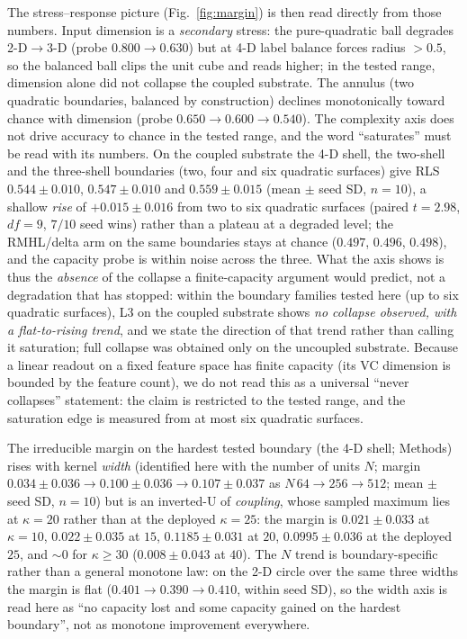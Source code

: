 \documentclass[preprint,12pt]{elsarticle}
\begin{document}
The stress--response picture (Fig.~\ref{fig:margin}) is then read directly
from those numbers. Input dimension is a \emph{secondary} stress: the pure-quadratic
ball degrades 2-D$\to$3-D (probe $0.800\to0.630$) but at 4-D label balance
forces radius $>0.5$, so the balanced ball clips the unit cube and reads
higher; in the tested range, dimension alone did not collapse the coupled
substrate. The
annulus (two quadratic boundaries, balanced by construction) declines
monotonically toward chance with dimension (probe $0.650\to0.600\to0.540$).
The complexity axis does not drive accuracy to chance in the tested range, and
the word ``saturates'' must be read with its numbers. On the coupled substrate
the 4-D shell, the two-shell and the three-shell boundaries (two, four and six
quadratic surfaces) give RLS $0.544\pm0.010$, $0.547\pm0.010$ and
$0.559\pm0.015$ (mean $\pm$ seed SD, $n=10$), a shallow \emph{rise} of
$+0.015\pm0.016$ from two to six quadratic surfaces (paired $t=2.98$, $df=9$,
$7/10$ seed wins) rather than a plateau at a degraded level; the
RMHL/delta arm on the same boundaries stays at chance ($0.497$, $0.496$,
$0.498$), and the capacity probe is within noise across the three. What the
axis shows is thus the \emph{absence} of the collapse a finite-capacity
argument would predict, not a degradation that has stopped: within the
boundary families tested here (up to six quadratic surfaces), L3 on the
coupled substrate shows \emph{no collapse observed, with a flat-to-rising
trend}, and we state the direction of that trend rather than calling it
saturation; full collapse was obtained only on the uncoupled substrate. Because a linear readout on a fixed feature space
has finite capacity (its VC dimension is bounded by the feature count), we
do not read this as a universal ``never collapses'' statement: the claim is
restricted to the tested range, and the saturation edge is measured from at
most six quadratic surfaces.

The irreducible margin on the hardest tested
boundary (the 4-D shell; Methods) rises with kernel
\emph{width} (identified here with the number of units $N$; margin
$0.034\pm0.036\to0.100\pm0.036\to0.107\pm0.037$ as $N\,64\to256\to512$; mean
$\pm$ seed SD, $n=10$) but is an inverted-U of \emph{coupling}, whose sampled
maximum lies at $\kappa=20$ rather than at the deployed $\kappa=25$: the
margin is $0.021\pm0.033$ at $\kappa=10$, $0.022\pm0.035$ at $15$,
$0.1185\pm0.031$ at $20$, $0.0995\pm0.036$ at the deployed $25$, and
$\sim0$ for $\kappa\geq30$ ($0.008\pm0.043$ at $40$).
The $N$ trend is boundary-specific rather than a general monotone law: on the
2-D circle over the same three widths the margin is flat
($0.401\to0.390\to0.410$, within seed SD), so the width axis is read here as
``no capacity lost and some capacity gained on the hardest boundary'', not as
monotone improvement everywhere.
\end{document}
